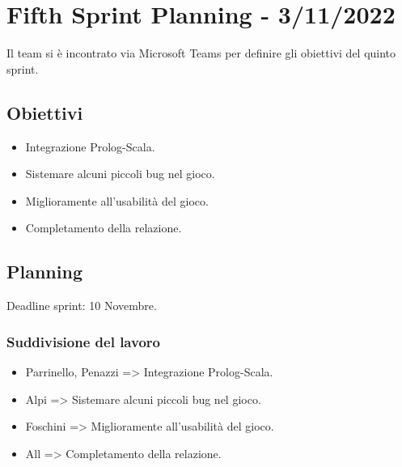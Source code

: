 \section*{Fifth Sprint Planning - 3/11/2022}
Il team si è incontrato via Microsoft Teams per definire gli obiettivi del quinto sprint.

\subsection*{Obiettivi}
\begin{itemize}
    \item Integrazione Prolog-Scala.
    \item Sistemare alcuni piccoli bug nel gioco.
    \item Miglioramente all'usabilità del gioco.
    \item Completamento della relazione.
\end{itemize}

\subsection*{Planning}
Deadline sprint: 10 Novembre.

\subsubsection*{Suddivisione del lavoro}
\begin{itemize}
    \item Parrinello, Penazzi => Integrazione Prolog-Scala.
    \item Alpi => Sistemare alcuni piccoli bug nel gioco.
    \item Foschini => Miglioramente all'usabilità del gioco.
    \item All => Completamento della relazione.
\end{itemize}